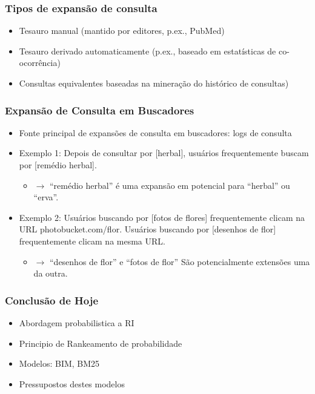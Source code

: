 \documentclass[compress]{beamer}
\def\myblue#1{\textcolor{texblue}{#1}}
\begin{document}
\begin{frame}
\frametitle{Tipos de expansão de consulta}
\begin{itemize}
\item Tesauro manual (mantido por editores, p.ex., PubMed)
\item Tesauro derivado automaticamente (p.ex., baseado em estatísticas de 
co-ocorr\^encia)
\item Consultas equivalentes baseadas na minera\c{c}\~ao do hist\'orico de 
consultas)
\end{itemize}
\end{frame}

\begin{frame}
\frametitle{Expansão de Consulta em Buscadores}
\begin{itemize}
\item Fonte principal de expansões de consulta em buscadores: logs de consulta
\item Exemplo 1: Depois de consultar por [herbal], usuários frequentemente buscam por [remédio herbal].
\begin{itemize}
\item $\rightarrow$ 
``remédio herbal'' é uma expansão em potencial para ``herbal'' ou ``erva''.
\end{itemize}

\item Exemplo 2: Usuários buscando por [fotos de flores] frequentemente clicam na URL \myblue{photobucket.com/flor}. 
Usuários buscando por [desenhos de flor]
  frequentemente clicam na \myblue{mesma URL}.
\begin{itemize}
\item $\rightarrow$ 
``desenhos de flor'' e ``fotos de flor'' São potencialmente extensões uma da outra.
\end{itemize}

\end{itemize}
\end{frame}


\begin{frame}

\frametitle{Conclusão de Hoje}
\begin{itemize}
\item Abordagem probabilistica a RI
\item Principio de Rankeamento de probabilidade
\item Modelos: BIM, BM25
\item Pressupostos destes modelos
\end{itemize}
\end{frame}
\end{document}
